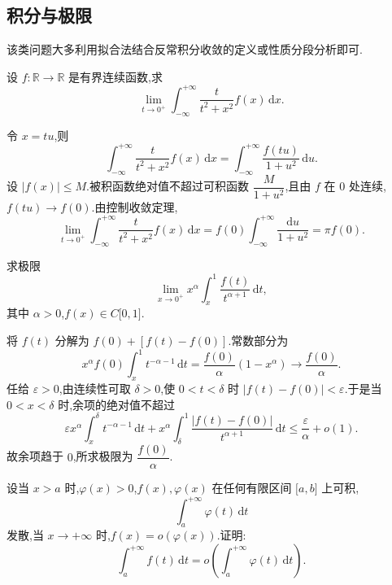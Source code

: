 \subsection{积分与极限}

该类问题大多利用拟合法结合反常积分收敛的定义或性质分段分析即可.

\begin{example}
  设 $f:\mathbb{R}\to\mathbb{R}$ 是有界连续函数,求
  \[
    \displaystyle\lim\limits_{t\to0^+}\int_{-\infty}^{+\infty}\dfrac{t}{t^2+x^2}f(x)\,\mathrm{d}x.
  \]
\end{example}
\exampleblank

\begin{solution}
  令 $x=tu$,则
  \[
    \displaystyle\int_{-\infty}^{+\infty}\dfrac{t}{t^2+x^2}f(x)\,\mathrm{d}x
    =\int_{-\infty}^{+\infty}\dfrac{f(tu)}{1+u^2}\,\mathrm{d}u.
  \]
  设 $|f(x)|\leq M$.被积函数绝对值不超过可积函数
  $\dfrac{M}{1+u^2}$,且由 $f$ 在 $0$ 处连续,$f(tu)\to f(0)$.由控制收敛定理,
  \[
    \displaystyle\lim\limits_{t\to0^+}\int_{-\infty}^{+\infty}
    \dfrac{t}{t^2+x^2}f(x)\,\mathrm{d}x
    =f(0)\int_{-\infty}^{+\infty}\dfrac{\mathrm{d}u}{1+u^2}
    =\pi f(0).
  \]
\end{solution}

\begin{example}
  求极限
  \[
    \displaystyle\lim\limits_{x\to0^+}x^\alpha\int_x^1\dfrac{f(t)}{t^{\alpha+1}}\,\mathrm{d}t,
  \]
  其中 $\alpha>0$,$f(x)\in C\lbrack 0,1\rbrack$.
\end{example}
\exampleblank

\begin{solution}
  将 $f(t)$ 分解为 $f(0)+[f(t)-f(0)]$.常数部分为
  \[
    x^\alpha f(0)\int_x^1t^{-\alpha-1}\,\mathrm{d}t
    =\dfrac{f(0)}{\alpha}(1-x^\alpha)
    \longrightarrow\dfrac{f(0)}{\alpha}.
  \]
  任给 $\varepsilon>0$,由连续性可取 $\delta>0$,使 $0<t<\delta$ 时
  $|f(t)-f(0)|<\varepsilon$.于是当 $0<x<\delta$ 时,余项的绝对值不超过
  \[
    \varepsilon x^\alpha\int_x^\delta t^{-\alpha-1}\,\mathrm{d}t
    +x^\alpha\int_\delta^1\dfrac{|f(t)-f(0)|}{t^{\alpha+1}}\,\mathrm{d}t
    \leq\dfrac{\varepsilon}{\alpha}+o(1).
  \]
  故余项趋于 $0$,所求极限为 $\dfrac{f(0)}{\alpha}$.
\end{solution}

\begin{example}
  设当 $x>a$ 时,$\varphi(x)>0$,$f(x),\varphi(x)$ 在任何有限区间 $\lbrack a,b\rbrack$ 上可积,
  \[
    \displaystyle\int_a^{+\infty}\varphi(t)\,\mathrm{d}t
  \]
  发散,当 $x\to+\infty$ 时,$f(x)=o(\varphi(x))$.证明:
  \[
    \displaystyle\int_a^{+\infty}f(t)\,\mathrm{d}t
    =o\left(\int_a^{+\infty}\varphi(t)\,\mathrm{d}t\right).
  \]
\end{example}
\exampleblank

